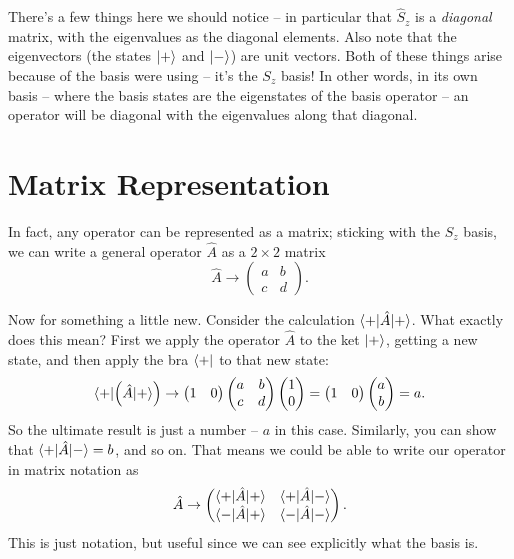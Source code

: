 There's a few things here we should notice -- in particular that $\hat{S}_z$ is a \emph{diagonal} matrix, with the eigenvalues as the diagonal elements.  Also note that the eigenvectors (the states $| + \rangle$ and $| - \rangle$) are unit vectors.  Both of these things arise because of the basis were using -- it's the $S_z$ basis!  In other words, in its own basis -- where the basis states are the eigenstates of the basis operator -- an operator will be diagonal with the eigenvalues along that diagonal.

\section{Matrix Representation}

In fact, any operator can be represented as a matrix; sticking with the $S_z$ basis, we can write a general operator $\hat{A}$ as a $2 \times 2$ matrix
\begin{equation}
\hat{A} \to \begin{pmatrix} a & b \\ c & d \end{pmatrix}.
\end{equation}

Now for something a little new.  Consider the calculation $\langle + | \hat{A} | + \rangle$.  What exactly does this mean?  First we apply the operator $\hat{A}$ to the ket $| + \rangle$, getting a new state, and then apply the bra $\langle + |$ to that new state:
\[
\langle + | \Big( \hat{A} | + \rangle \Big) \to \begin{pmatrix} 1 & 0 \end{pmatrix} \begin{pmatrix} a & b \\ c & d \end{pmatrix} \begin{pmatrix} 1 \\ 0 \end{pmatrix} = \begin{pmatrix} 1 & 0 \end{pmatrix} \begin{pmatrix} a \\ b \end{pmatrix} = a.
\]
So the ultimate result is just a number -- $a$ in this case.  Similarly, you can show that $\langle + |\hat{A} | - \rangle = b$, and so on.  That means we could be able to write our operator in matrix notation as
\begin{equation}
\hat{A} \to \begin{pmatrix} \langle + |\hat{A}| + \rangle & \langle + |\hat{A}| - \rangle \\ \langle - |\hat{A}| + \rangle & \langle - |\hat{A}| - \rangle \end{pmatrix}.
\end{equation}
This is just notation, but useful since we can see explicitly what the basis is.


